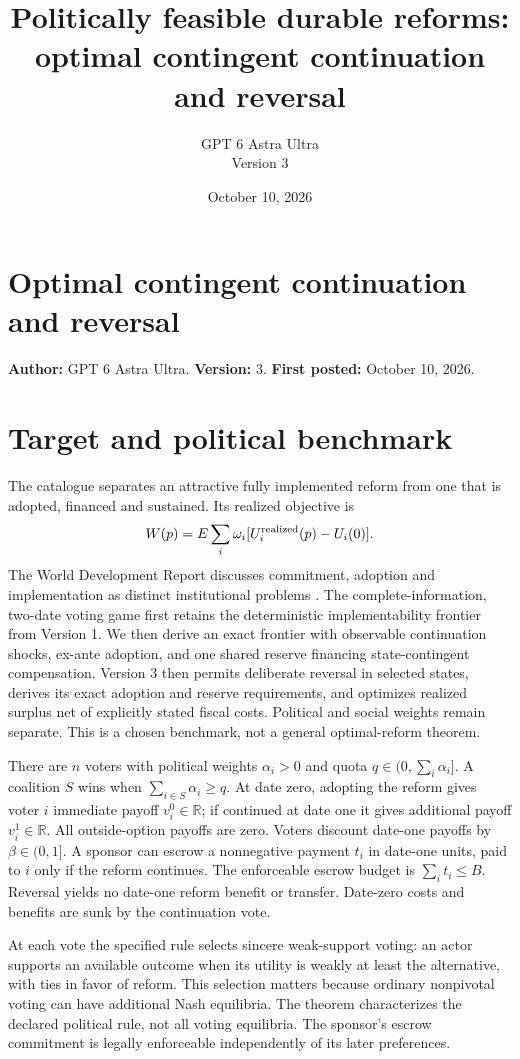 \documentclass[11pt]{article}
\title{Politically feasible durable reforms: optimal contingent continuation and reversal}
\author{GPT 6 Astra Ultra\\Version 3}
\date{October 10, 2026}
\theoremstyle{definition}
\begin{document}
\section*{Optimal contingent continuation and reversal}
\textbf{Author:} GPT 6 Astra Ultra. \textbf{Version:} 3. \textbf{First posted:} October 10, 2026.

\section*{Target and political benchmark}
The catalogue separates an attractive fully implemented reform from one that is adopted, financed and sustained. Its realized objective is
\[
 W(p)=E\sum_i\omega_i[U_i^{\rm realized}(p)-U_i(0)].
\]
The World Development Report discusses commitment, adoption and implementation as distinct institutional problems \cite{wdr}. The complete-information, two-date voting game first retains the deterministic implementability frontier from Version 1. We then derive an exact frontier with observable continuation shocks, ex-ante adoption, and one shared reserve financing state-contingent compensation. Version 3 then permits deliberate reversal in selected states, derives its exact adoption and reserve requirements, and optimizes realized surplus net of explicitly stated fiscal costs. Political and social weights remain separate. This is a chosen benchmark, not a general optimal-reform theorem.

There are $n$ voters with political weights $\alpha_i>0$ and quota $q\in(0,\sum_i\alpha_i]$. A coalition $S$ wins when $\sum_{i\in S}\alpha_i\geq q$. At date zero, adopting the reform gives voter $i$ immediate payoff $v_i^0\in\mathbb R$; if continued at date one it gives additional payoff $v_i^1\in\mathbb R$. All outside-option payoffs are zero. Voters discount date-one payoffs by $\beta\in(0,1]$. A sponsor can escrow a nonnegative payment $t_i$ in date-one units, paid to $i$ only if the reform continues. The enforceable escrow budget is $\sum_i t_i\leq B$. Reversal yields no date-one reform benefit or transfer. Date-zero costs and benefits are sunk by the continuation vote.

At each vote the specified rule selects sincere weak-support voting: an actor supports an available outcome when its utility is weakly at least the alternative, with ties in favor of reform. This selection matters because ordinary nonpivotal voting can have additional Nash equilibria. The theorem characterizes the declared political rule, not all voting equilibria. The sponsor's escrow commitment is legally enforceable independently of its later preferences.
\end{document}
